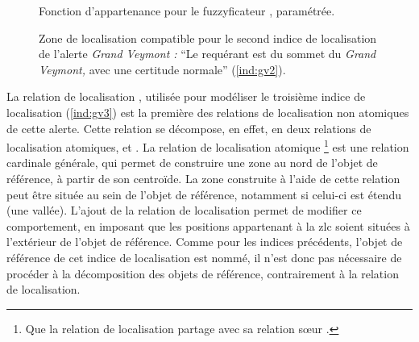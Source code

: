 \begin{figure}
  \centering
  
  \caption{Fonction d'appartenance pour le fuzzyficateur
    \protect{}, paramétrée.}
  \label{fig:fuzzy_veyont_sousSommet}
\end{figure}

\begin{figure}
  \centering
  
  \caption{Zone de localisation compatible pour le second indice de
    localisation de l'alerte \emph{Grand Veymont :} \enquote{Le
      requérant est \protect{} du sommet du
      \emph{Grand Veymont,} avec une certitude normale}
    (\ref{ind:gv2}).}
  \label{fig:ZLC_GrandVeymont_2}
\end{figure}


La relation de localisation ,
utilisée pour modéliser le troisième indice de localisation
(\ref{ind:gv3}) est la première des relations de localisation non
atomiques de cette alerte. Cette relation se décompose, en effet, en
deux relations de localisation atomiques,  et
. La relation de localisation
atomique  \footnote{Que la relation de
  localisation \protect{} partage avec
  sa relation sœur \protect{}.}
est une relation cardinale générale, qui permet de construire une zone
au nord de l'objet de référence, à partir de son centroïde. La zone
construite à l'aide de cette relation peut être située au sein de
l'objet de référence, notamment si celui-ci est étendu (\eg une
vallée). L'ajout de la relation de localisation
 permet de modifier ce
comportement, en imposant que les positions appartenant à la \ac{zlc}
soient situées à l'extérieur de l'objet de référence. Comme pour les
indices précédents, l'objet de référence de cet indice de localisation
est nommé, il n'est donc pas nécessaire de procéder à la décomposition
des objets de référence, contrairement à la relation de localisation.

